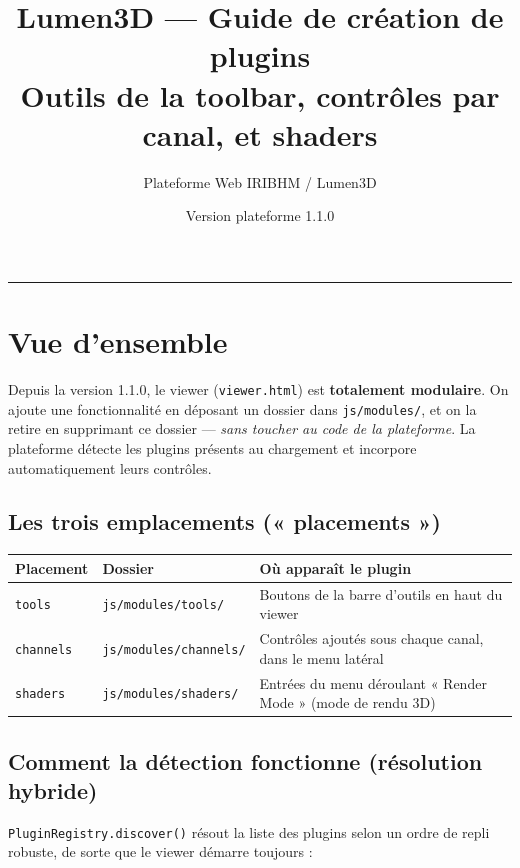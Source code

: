 \documentclass[11pt,a4paper]{article}
\title{\textbf{Lumen3D --- Guide de création de plugins}\\[4pt]
\large Outils de la toolbar, contrôles par canal, et shaders}
\author{Plateforme Web IRIBHM / Lumen3D}
\date{Version plateforme 1.1.0}
\newcommand{\code}[1]{\texttt{#1}}
\newcommand{\filepath}[1]{\texttt{\small #1}}
\begin{document}
\maketitle
\tableofcontents
\vspace{1em}
\hrule
\vspace{1em}

\section{Vue d'ensemble}

Depuis la version 1.1.0, le viewer (\filepath{viewer.html}) est \textbf{totalement
modulaire}. On ajoute une fonctionnalité en déposant un dossier dans
\filepath{js/modules/}, et on la retire en supprimant ce dossier --- \emph{sans
toucher au code de la plateforme}. La plateforme détecte les plugins présents au
chargement et incorpore automatiquement leurs contrôles.

\subsection{Les trois emplacements (« placements »)}

\begin{center}
\begin{tabularx}{\linewidth}{@{}l l X@{}}
\toprule
\textbf{Placement} & \textbf{Dossier} & \textbf{Où apparaît le plugin} \\
\midrule
\code{tools} & \filepath{js/modules/tools/} & Boutons de la barre d'outils en haut du viewer \\
\code{channels} & \filepath{js/modules/channels/} & Contrôles ajoutés sous chaque canal, dans le menu latéral \\
\code{shaders} & \filepath{js/modules/shaders/} & Entrées du menu déroulant « Render Mode » (mode de rendu 3D) \\
\bottomrule
\end{tabularx}
\end{center}

\subsection{Comment la détection fonctionne (résolution hybride)}

\code{PluginRegistry.discover()} résout la liste des plugins selon un ordre de
repli robuste, de sorte que le viewer démarre toujours :
\end{document}
